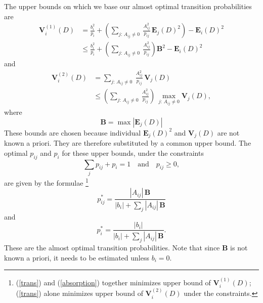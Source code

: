 \documentclass[a4paper,11pt]{article}
\theoremstyle{remark}
\theoremstyle{definition}
\begin{document}
        The upper bounds on which we base our almost optimal transition
        probabilities are
        \[ \begin{split}
            \mathbf{V}_i^{(1)}(D)
            &= \frac{b_i^2}{p_i} + \left(\sum_{j:\,A_{ij}\ne0}\:
               \frac{A_{ij}^2}{p_{ij}}\, \mathbf{E}_j(D)^2\right)
               - \mathbf{E}_i(D)^2 \\
            &\le \frac{b_i^2}{p_i} + \left(\sum_{j:\,A_{ij}\ne0}\:
                             \frac{A_{ij}^2}{p_{ij}} \right) \mathbf{B}^2
                 - \mathbf{E}_i(D)^2
        \end{split} \]
        and
        \[ \begin{split}
            \mathbf{V}_i^{(2)}(D)
            &= \sum_{j:\,A_{ij}\ne0}\:
               \frac{A_{ij}^2}{p_{ij}}\, \mathbf{V}_j(D) \\
            &\le \left(\sum_{j:\,A_{ij}\ne0}\: \frac{A_{ij}^2}{p_{ij}}\right)\, 
               \max_{j:\,A_{ij}\ne0} \mathbf{V}_j(D),
        \end{split} \]
        where 
        \[ \mathbf{B} = \max |\mathbf{E}_j(D)|
        \]
        These bounds are chosen because individual $\mathbf{E}_j(D)^2$ and
        $\mathbf{V}_j(D)$ are not known a priori.  They are therefore
        substituted by a common upper bound.  The optimal $p_{ij}$ and $p_i$
        for these upper bounds, under the constraints
        \[ \sum_j p_{ij} + p_i = 1\quad\mbox{and}\quad p_{ij}\ge 0, \]
        are given by the formulae
        \footnote{(\ref{trans}) and (\ref{absorption}) together minimizes
        upper bound of $\mathbf{V}_i^{(1)}(D)$; (\ref{trans}) alone minimizes
        upper bound of $\mathbf{V}_i^{(2)}(D)$ under the constraints.}
        \begin{equation} \label{trans}
            p_{ij}^* = \frac{|A_{ij}|\, \mathbf{B}}
                            {|b_i| + \sum_j |A_{ij}|\, \mathbf{B}}
        \end{equation}
        and
        \begin{equation} \label{absorption}
            p_i^* = \frac{|b_i|} {|b_i| + \sum_j |A_{ij}|\, \mathbf{B}}.
        \end{equation}
        These are the almost optimal transition probabilities.  Note that
        since $\mathbf{B}$ is not known a priori, it needs to be estimated
        unless $b_i = 0$.
        
\end{document}
